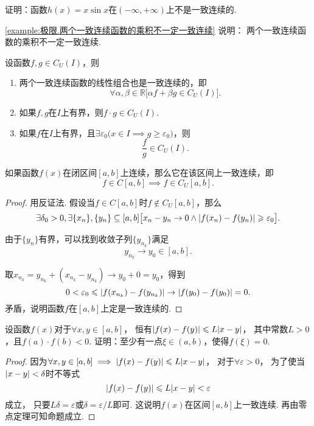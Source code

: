 \begin{example}\label{example:极限.两个一致连续函数的乘积不一定一致连续}
证明：函数\(h(x) = x \sin x\)在\((-\infty,+\infty)\)上不是一致连续的.
\end{example}
\cref{example:极限.两个一致连续函数的乘积不一定一致连续} 说明：
两个一致连续函数的乘积不一定一致连续.

\begin{theorem}[一致连续函数的四则运算法则]\label{theorem:极限.闭区间上连续函数的性质.一致连续函数的四则运算法则}
设函数\(f,g \in C_U(I)\)，则
\begin{enumerate}
\item 两个一致连续函数的线性组合也是一致连续的，即\[
\forall\alpha,\beta\in\mathbb{R} \bigl[ \alpha f + \beta g \in C_U(I) \bigr].
\]

\item 如果\(f,g\)在\(I\)上有界，则\(f \cdot g \in C_U(I)\).

\item 如果\(f\)在\(I\)上有界，且\(\exists\varepsilon_0 \bigl( x \in I \implies g \geqslant \varepsilon_0 \bigr)\)，则\[
\frac{f}{g} \in C_U(I).
\]
\end{enumerate}
\end{theorem}

\begin{theorem}[一致连续性定理]\label{theorem:极限.闭区间上连续函数的性质.一致连续性定理}
如果函数\(f(x)\)在闭区间\([a,b]\)上连续，那么它在该区间上一致连续，即\[
f \in C[a,b]
\implies
f \in C_U[a,b].
\]
\begin{proof}
用反证法.
假设当\(f \in C[a,b]\)时\(f \notin C_U[a,b]\)，那么\[
\exists\delta_0>0,
\exists\{x_n\},\{y_n\}\subseteq[a,b]
\bigl[
x_n-y_n\to0
\land
\abs{f(x_n)-f(y_n)}\geqslant\varepsilon_0
\bigr].
\]

由于\(\{y_n\}\)有界，可以找到收敛子列\(\{y_{n_k}\}\)满足\[
y_{n_k} \to y_0\in[a,b].
\]

取\(x_{n_k} = y_{n_k} + (x_{n_k} - y_{n_k})
\to y_0 + 0 = y_0\)，得到\[
0 < \varepsilon_0 \leqslant \abs{f(x_{n_k})-f(y_{n_k})}
\to \abs{f(y_0)-f(y_0)} = 0.
\]矛盾，说明函数\(f\)在\([a,b]\)上定是一致连续的.
\end{proof}
\end{theorem}

\begin{example}
设函数\(f(x)\)对于\(\forall x,y \in [a,b]\)，%
恒有\(\abs{f(x) - f(y)} \leqslant L \abs{x - y}\)，%
其中常数\(L > 0\)，且\(f(a) \cdot f(b) < 0\).
证明：至少有一点\(\xi \in (a,b)\)，使得\(f(\xi) = 0\).
\begin{proof}
因为\(\forall x,y \in [a,b] \implies \abs{f(x) - f(y)} \leqslant L \abs{x - y}\)，%
对于\(\forall \varepsilon > 0\)，%
为了使当\(\abs{x - y} < \delta\)时不等式\[
\abs{f(x) - f(y)} \leqslant L \abs{x - y} < \varepsilon
\]成立，%
只要\(L \delta = \varepsilon\)或\(\delta = \varepsilon / L\)即可.
这说明\(f(x)\)在区间\([a,b]\)上一致连续.
再由零点定理可知命题成立.
\end{proof}
\end{example}

